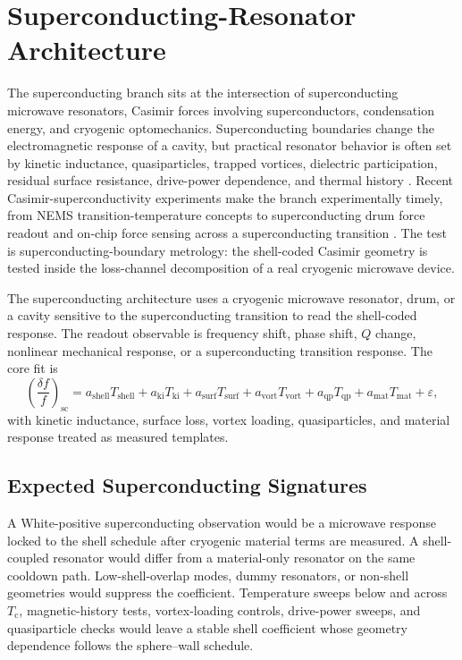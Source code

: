 \documentclass[11pt]{article}
\newcommand{\Tc}{T_{\mathrm{c}}}
\newcommand{\eps}{\varepsilon}
\begin{document}
\section{Superconducting-Resonator Architecture}

The superconducting branch sits at the intersection of superconducting
microwave resonators, Casimir forces involving superconductors, condensation
energy, and cryogenic optomechanics. Superconducting boundaries change the
electromagnetic response of a cavity, but practical resonator behavior is often
set by kinetic inductance, quasiparticles, trapped vortices, dielectric
participation, residual surface resistance, drive-power dependence, and thermal
history \cite{Gurevich2023}. Recent Casimir-superconductivity experiments make
the branch experimentally timely, from NEMS transition-temperature concepts to
superconducting drum force readout and on-chip force sensing across a
superconducting transition \cite{Perez2020,DeJong2025,Xu2026}. The test is
superconducting-boundary metrology: the shell-coded Casimir geometry is tested
inside the loss-channel decomposition of a real cryogenic microwave device.

The superconducting architecture uses a cryogenic microwave resonator, drum, or
a cavity sensitive to the superconducting transition to read the shell-coded
response. The readout observable is frequency shift, phase shift, \(Q\)
change, nonlinear mechanical response, or a superconducting transition
response. The core fit is
\begin{equation}
  \left(\frac{\delta f}{f}\right)_{\mathrm{sc}}
  =
  a_{\mathrm{shell}}T_{\mathrm{shell}}
  + a_{\mathrm{ki}}T_{\mathrm{ki}}
  + a_{\mathrm{surf}}T_{\mathrm{surf}}
  + a_{\mathrm{vort}}T_{\mathrm{vort}}
  + a_{\mathrm{qp}}T_{\mathrm{qp}}
  + a_{\mathrm{mat}}T_{\mathrm{mat}}
  + \eps ,
  \label{eq:sc}
\end{equation}
with kinetic inductance, surface loss, vortex loading, quasiparticles, and
material response treated as measured templates.

\subsection{Expected Superconducting Signatures}

A White-positive superconducting observation would be a microwave response
locked to the shell schedule after cryogenic material terms are measured. A
shell-coupled resonator would differ from a material-only resonator on the
same cooldown path. Low-shell-overlap modes, dummy resonators, or non-shell
geometries would suppress the coefficient. Temperature sweeps below and across
\(\Tc\), magnetic-history tests, vortex-loading controls, drive-power sweeps,
and quasiparticle checks would leave a stable shell coefficient whose geometry
dependence follows the sphere--wall schedule.
\end{document}
